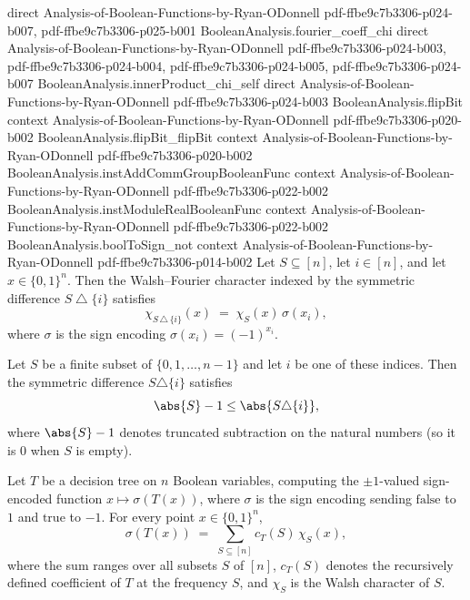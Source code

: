 \begin{lemma}
  {direct}
  {Analysis-of-Boolean-Functions-by-Ryan-ODonnell}
  {pdf-ffbe9c7b3306-p024-b007,
    pdf-ffbe9c7b3306-p025-b001}
\proofstep
  {BooleanAnalysis.fourier_coeff_chi}
  {direct}
  {Analysis-of-Boolean-Functions-by-Ryan-ODonnell}
  {pdf-ffbe9c7b3306-p024-b003,
    pdf-ffbe9c7b3306-p024-b004,
    pdf-ffbe9c7b3306-p024-b005,
    pdf-ffbe9c7b3306-p024-b007}
\proofstep
  {BooleanAnalysis.innerProduct_chi_self}
  {direct}
  {Analysis-of-Boolean-Functions-by-Ryan-ODonnell}
  {pdf-ffbe9c7b3306-p024-b003}
\proofstep
  {BooleanAnalysis.flipBit}
  {context}
  {Analysis-of-Boolean-Functions-by-Ryan-ODonnell}
  {pdf-ffbe9c7b3306-p020-b002}
\proofstep
  {BooleanAnalysis.flipBit_flipBit}
  {context}
  {Analysis-of-Boolean-Functions-by-Ryan-ODonnell}
  {pdf-ffbe9c7b3306-p020-b002}
\proofstep
  {BooleanAnalysis.instAddCommGroupBooleanFunc}
  {context}
  {Analysis-of-Boolean-Functions-by-Ryan-ODonnell}
  {pdf-ffbe9c7b3306-p022-b002}
\proofstep
  {BooleanAnalysis.instModuleRealBooleanFunc}
  {context}
  {Analysis-of-Boolean-Functions-by-Ryan-ODonnell}
  {pdf-ffbe9c7b3306-p022-b002}
\proofstep
  {BooleanAnalysis.boolToSign_not}
  {context}
  {Analysis-of-Boolean-Functions-by-Ryan-ODonnell}
  {pdf-ffbe9c7b3306-p014-b002}
Let $S\subseteq[n]$, let $i\in[n]$, and let $x\in\{0,1\}^n$. Then the Walsh--Fourier
character indexed by the symmetric difference $S\mathbin{\triangle}\{i\}$ satisfies
\[
  \chi_{S\,\triangle\,\{i\}}(x) \;=\; \chi_S(x)\,\sigma(x_i),
\]
where $\sigma$ is the sign encoding $\sigma(x_i)=(-1)^{x_i}$.
\end{lemma}

\begin{lemma}
\label{DecisionTree.card_symmDiff_singleton}
\leanok
{}
Let $S$ be a finite subset of $\{0,1,\dots,n-1\}$ and let $i$ be one of these indices.
Then the symmetric difference $S \triangle \{i\}$ satisfies
\[
\abs{S} - 1 \le \abs{S \triangle \{i\}},
\]
where $\abs{S} - 1$ denotes truncated subtraction on the natural numbers (so it is $0$
when $S$ is empty).
\end{lemma}

\begin{lemma}
\label{DecisionTree.signEval_eq_sum_coeffs}
\leanok
{}
Let $T$ be a decision tree on $n$ Boolean variables, computing the $\pm 1$-valued
sign-encoded function $x \mapsto \sigma(T(x))$, where $\sigma$ is the sign encoding
sending $\mathrm{false}$ to $1$ and $\mathrm{true}$ to $-1$. For every point $x \in
\{0,1\}^n$,
\[
  \sigma(T(x)) \;=\; \sum_{S \subseteq [n]} c_T(S)\,\chi_S(x),
\]
where the sum ranges over all subsets $S$ of $[n]$, $c_T(S)$ denotes the recursively
defined coefficient of $T$ at the frequency $S$, and $\chi_S$ is the Walsh character of
$S$.
\end{lemma}

